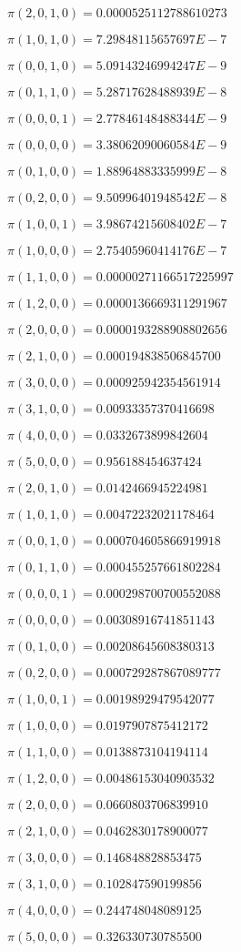 \item $\pi(2,0,1,0) = 0.0000525112788610273$
\item $\pi(1,0,1,0) = 7.29848115657697E-7$
\item $\pi(0,0,1,0) = 5.09143246994247E-9$
\item $\pi(0,1,1,0) = 5.28717628488939E-8$
\item $\pi(0,0,0,1) = 2.77846148488344E-9$
\item $\pi(0,0,0,0) = 3.38062090060584E-9$
\item $\pi(0,1,0,0) = 1.88964883335999E-8$
\item $\pi(0,2,0,0) = 9.50996401948542E-8$
\item $\pi(1,0,0,1) = 3.98674215608402E-7$
\item $\pi(1,0,0,0) = 2.75405960414176E-7$
\item $\pi(1,1,0,0) = 0.00000271166517225997$
\item $\pi(1,2,0,0) = 0.0000136669311291967$
\item $\pi(2,0,0,0) = 0.0000193288908802656$
\item $\pi(2,1,0,0) = 0.000194838506845700$
\item $\pi(3,0,0,0) = 0.000925942354561914$
\item $\pi(3,1,0,0) = 0.00933357370416698$
\item $\pi(4,0,0,0) = 0.0332673899842604$
\item $\pi(5,0,0,0) = 0.956188454637424$

\item $\pi(2, 0, 1, 0) = 0.0142466945224981$
\item $\pi(1, 0, 1, 0) = 0.00472232021178464$
\item $\pi(0, 0, 1, 0) = 0.000704605866919918$
\item $\pi(0, 1, 1, 0) = 0.000455257661802284$
\item $\pi(0, 0, 0, 1) = 0.000298700700552088$
\item $\pi(0, 0, 0, 0) = 0.00308916741851143$
\item $\pi(0, 1, 0, 0) = 0.00208645608380313$
\item $\pi(0, 2, 0, 0) = 0.000729287867089777$
\item $\pi(1, 0, 0, 1) = 0.00198929479542077$
\item $\pi(1, 0, 0, 0) = 0.0197907875412172$
\item $\pi(1, 1, 0, 0) = 0.0138873104194114$
\item $\pi(1, 2, 0, 0) = 0.00486153040903532$
\item $\pi(2, 0, 0, 0) = 0.0660803706839910$
\item $\pi(2, 1, 0, 0) = 0.0462830178900077$
\item $\pi(3, 0, 0, 0) = 0.146848828853475$
\item $\pi(3, 1, 0, 0) = 0.102847590199856$
\item $\pi(4, 0, 0, 0) = 0.244748048089125$
\item $\pi(5, 0, 0, 0) = 0.326330730785500$